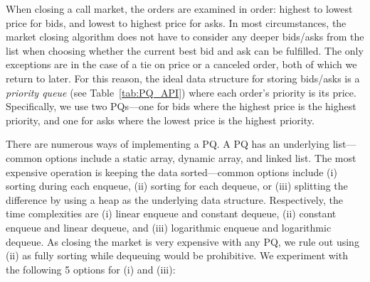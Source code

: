 When closing a call market, the orders are examined in order: highest to lowest price for bids, and lowest to highest price for asks. In most circumstances, the market closing algorithm does not have to consider any deeper bids/asks from the list when choosing whether the current best bid and ask can be fulfilled. The only exceptions are in the case of a tie on price or a canceled order, both of which we return to later. For this reason, the ideal data structure for storing bids/asks is a \textit{priority queue} (see Table~\ref{tab:PQ_API}) where each order's priority is its price. Specifically, we use two PQs---one for bids where the highest price is the highest priority, and one for asks where the lowest price is the highest priority. 

There are numerous ways of implementing a PQ. A PQ has an underlying list---common options include a static array, dynamic array, and linked list. The most expensive operation is keeping the data sorted---common options include (i) sorting during each enqueue, (ii) sorting for each dequeue, or (iii) splitting the difference by using a heap as the underlying data structure. Respectively, the time complexities are (i) linear enqueue and constant dequeue, (ii) constant enqueue and linear dequeue, and (iii) logarithmic enqueue and logarithmic dequeue. As closing the market is very expensive with any PQ, we rule out using (ii) as fully sorting while dequeuing would be prohibitive. We experiment with the following 5 options for (i) and (iii):

